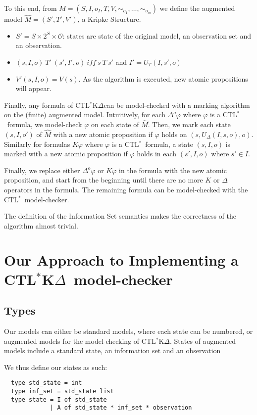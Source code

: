 \documentclass[dvipsnames]{acmart}
\def\ctls{CTL$^{*}$}
\def\ctlskd{CTL$^{*}$K$\Delta$}
\def\K{\mathit{K}}
\def\D#1{\Delta^{#1}}
\def\eqstate#1{\sim_{#1}}
\def\iff{\ \mathit{iff}\ }
\def\UD{U_{\Delta}}
\def\UT{U_T}
\begin{document}
To this end, from $M=(S,I,o_I,T,V,\eqstate{o_1},\dots,\eqstate{o_m})$ we define the augmented model $\hat{M}=(S',T',V')$, a Kripke Structure.
\begin{itemize}
\item $S'=S\times 2^{S}\times \mathcal{O}$: states are state of the original model, an observation set and an observation.
\item $(s,I,o)~T'~(s',I',o)\iff s~T~s'$ and $I'=\UT(I,s',o)$
\item $V'(s,I,o)=V(s)$. As the algorithm is executed, new atomic propositions will appear.
\end{itemize}

Finally, any formula of \ctlskd can be model-checked with a marking algorithm on the (finite) augmented model.
Intuitively, for each $\D{o}\varphi$ where $\varphi$ is a \ctls\ formula, we model-check $\varphi$ on each state of $\hat{M}$.
Then, we mark each state $(s,I,o')$ of $\hat{M}$ with a new atomic proposition if $\varphi$ holds on $(s,\UD(I,s,o),o)$.
Similarly for formulas $\K\varphi$ where $\varphi$ is a \ctls\ formula, a state $(s,I,o)$ is marked with a new atomic proposition if $\varphi$ holds in each $(s',I,o)$ where $s'\in I$.

Finally, we replace either $\D{o}\varphi$ or $\K\varphi$ in the formula with the new atomic proposition, and start from the beginning until there are no more $\K$ or $\Delta$ operators in the formula. The remaining formula can be model-checked with the \ctls\ model-checker.

The definition of the Information Set semantics makes the correctness of the algorithm almost trivial.

\section{Our Approach to Implementing a \ctlskd\ model-checker}

\subsection{Types}
Our models can either be standard models, where each state can be numbered, or augmented models for the model-checking of \ctlskd.
States of augmented models include a standard state, an information set and an observation

We thus define our states as such:
\begin{lstlisting}
  type std_state = int
  type inf_set = std_state list
  type state = I of std_state
             | A of std_state * inf_set * observation
\end{lstlisting}
\end{document}
